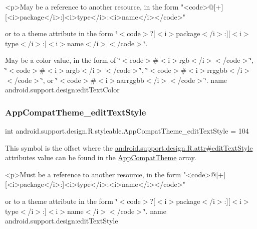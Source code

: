 \begin{DoxyVerb}      <p>May be a reference to another resource, in the form "<code>@[+][<i>package</i>:]<i>type</i>:<i>name</i></code>"
\end{DoxyVerb}
 or to a theme attribute in the form \char`\"{}$<$code$>$?\mbox{[}$<$i$>$package$<$/i$>$\+:\mbox{]}\mbox{[}$<$i$>$type$<$/i$>$\+:\mbox{]}$<$i$>$name$<$/i$>$$<$/code$>$\char`\"{}. 

May be a color value, in the form of \char`\"{}$<$code$>$\#$<$i$>$rgb$<$/i$>$$<$/code$>$\char`\"{}, \char`\"{}$<$code$>$\#$<$i$>$argb$<$/i$>$$<$/code$>$\char`\"{}, \char`\"{}$<$code$>$\#$<$i$>$rrggbb$<$/i$>$$<$/code$>$\char`\"{}, or \char`\"{}$<$code$>$\#$<$i$>$aarrggbb$<$/i$>$$<$/code$>$\char`\"{}.  name android.\+support.\+design\+:edit\+Text\+Color \mbox{\label{classandroid_1_1support_1_1design_1_1R_1_1styleable_acc9842f5a15682537a17a07297b3d1fa}} 
\subsubsection{\texorpdfstring{App\+Compat\+Theme\+\_\+edit\+Text\+Style}{AppCompatTheme\_editTextStyle}}
{\footnotesize\ttfamily int android.\+support.\+design.\+R.\+styleable.\+App\+Compat\+Theme\+\_\+edit\+Text\+Style = 104\hspace{0.3cm}{\ttfamily [static]}}

This symbol is the offset where the \hyperlink{classandroid_1_1support_1_1design_1_1R_1_1attr_a96bb8f72045bd97b7c4de5d060456b84}{android.\+support.\+design.\+R.\+attr\#edit\+Text\+Style} attribute\textquotesingle{}s value can be found in the \hyperlink{classandroid_1_1support_1_1design_1_1R_1_1styleable_afb351dc8de20cbd4c89abe360373010c}{App\+Compat\+Theme} array.

\begin{DoxyVerb}      <p>Must be a reference to another resource, in the form "<code>@[+][<i>package</i>:]<i>type</i>:<i>name</i></code>"
\end{DoxyVerb}
 or to a theme attribute in the form \char`\"{}$<$code$>$?\mbox{[}$<$i$>$package$<$/i$>$\+:\mbox{]}\mbox{[}$<$i$>$type$<$/i$>$\+:\mbox{]}$<$i$>$name$<$/i$>$$<$/code$>$\char`\"{}.  name android.\+support.\+design\+:edit\+Text\+Style \mbox{\label{classandroid_1_1support_1_1design_1_1R_1_1styleable_a1b9f70963e0781f0c4c4e47161f8cb0f}} 
